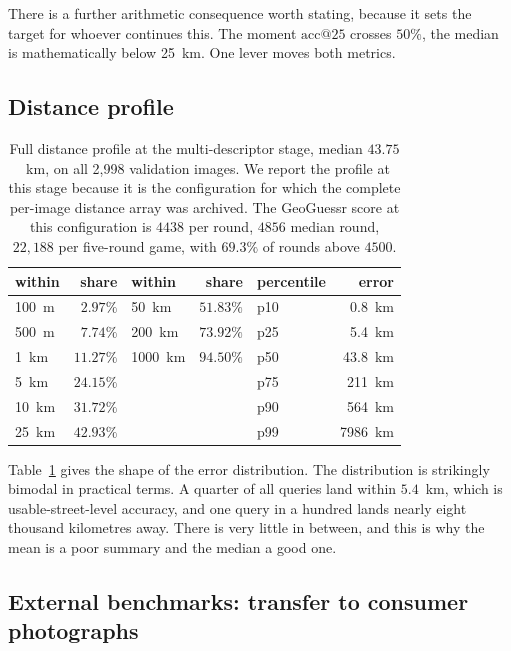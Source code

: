\documentclass[11pt,a4paper]{article}
\begin{document}
There is a further arithmetic consequence worth stating, because it sets the target for
whoever continues this. The moment $\mathrm{acc@}25$ crosses $50\%$, the median is
mathematically below 25~km. One lever moves both metrics.

\subsection{Distance profile}

\begin{table}[t]
\centering
\small
\begin{tabular}{lr@{\hskip 2.5em}lr@{\hskip 2.5em}lr}
\toprule
within & share & within & share & percentile & error \\
\midrule
100~m & $2.97\%$ & 50~km & $51.83\%$ & p10 & 0.8~km \\
500~m & $7.74\%$ & 200~km & $73.92\%$ & p25 & 5.4~km \\
1~km & $11.27\%$ & 1000~km & $94.50\%$ & p50 & 43.8~km \\
5~km & $24.15\%$ & & & p75 & 211~km \\
10~km & $31.72\%$ & & & p90 & 564~km \\
25~km & $42.93\%$ & & & p99 & 7986~km \\
\bottomrule
\end{tabular}
\caption{Full distance profile at the multi-descriptor stage, median $43.75$~km, on all 2{,}998 validation
images. We report the profile at this stage because it is the configuration for which the
complete per-image distance array was archived. The GeoGuessr score at this configuration is
$4438$ per round, $4856$ median round, $22{,}188$ per five-round game, with $69.3\%$ of rounds
above $4500$.}
\label{tab:profile}
\end{table}

Table~\ref{tab:profile} gives the shape of the error distribution. The distribution is
strikingly bimodal in practical terms. A quarter of all queries land within $5.4$~km, which is
usable-street-level accuracy, and one query in a hundred lands nearly eight thousand
kilometres away. There is very little in between, and this is why the mean is a poor summary
and the median a good one.

\subsection{External benchmarks: transfer to consumer photographs}
\label{sec:external}
\end{document}
